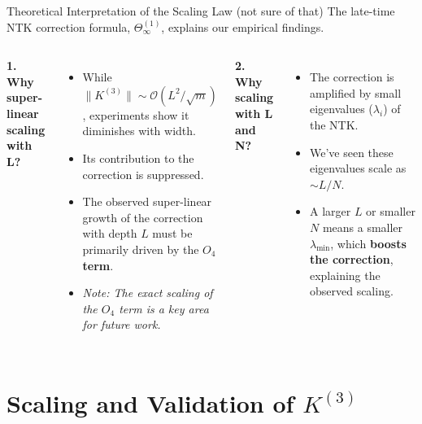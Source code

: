 \documentclass{beamer}
\newcommand{\Order}{\mathcal{O}}
\begin{document}
\begin{frame}{Theoretical Interpretation of the Scaling Law (not sure of that)}
    The late-time NTK correction formula, $\Theta^{(1)}_\infty$, explains our empirical findings.
    
    \begin{columns}
    \textbf{1. Why super-linear scaling with L?}
    \begin{itemize}
        \item While $\|K^{(3)}\| \sim \Order(L^2/\sqrt{m})$, experiments show it diminishes with width.
        \item Its contribution to the correction is suppressed.
        \item The observed super-linear growth of the correction with depth $L$ must be primarily driven by the \textbf{$O_4$ term}.
        \item \textit{Note: The exact scaling of the $O_4$ term is a key area for future work.}
    \end{itemize}
    
    \textbf{2. Why scaling with L and N?}
    \begin{itemize}
        \item The correction is amplified by small eigenvalues ($\lambda_i$) of the NTK.
        \item We've seen these eigenvalues scale as $\sim L/N$.
        \item A larger $L$ or smaller $N$ means a smaller $\lambda_{\min}$, which \textbf{boosts the correction}, explaining the observed scaling.
    \end{itemize}
    \end{columns}
    \end{frame}


\section{Scaling and Validation of $K^{(3)}$}
\end{document}
